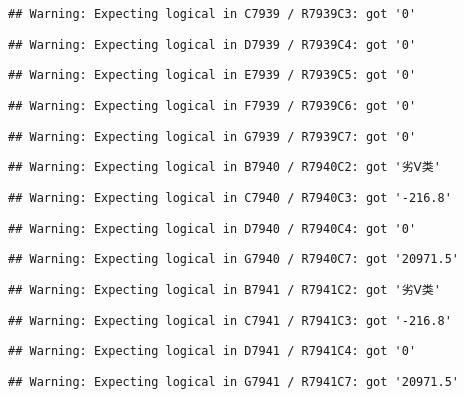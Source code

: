 \documentclass[
]{article}
\begin{document}
\begin{verbatim}
## Warning: Expecting logical in C7939 / R7939C3: got '0'
\end{verbatim}

\begin{verbatim}
## Warning: Expecting logical in D7939 / R7939C4: got '0'
\end{verbatim}

\begin{verbatim}
## Warning: Expecting logical in E7939 / R7939C5: got '0'
\end{verbatim}

\begin{verbatim}
## Warning: Expecting logical in F7939 / R7939C6: got '0'
\end{verbatim}

\begin{verbatim}
## Warning: Expecting logical in G7939 / R7939C7: got '0'
\end{verbatim}

\begin{verbatim}
## Warning: Expecting logical in B7940 / R7940C2: got '劣Ⅴ类'
\end{verbatim}

\begin{verbatim}
## Warning: Expecting logical in C7940 / R7940C3: got '-216.8'
\end{verbatim}

\begin{verbatim}
## Warning: Expecting logical in D7940 / R7940C4: got '0'
\end{verbatim}

\begin{verbatim}
## Warning: Expecting logical in G7940 / R7940C7: got '20971.5'
\end{verbatim}

\begin{verbatim}
## Warning: Expecting logical in B7941 / R7941C2: got '劣Ⅴ类'
\end{verbatim}

\begin{verbatim}
## Warning: Expecting logical in C7941 / R7941C3: got '-216.8'
\end{verbatim}

\begin{verbatim}
## Warning: Expecting logical in D7941 / R7941C4: got '0'
\end{verbatim}

\begin{verbatim}
## Warning: Expecting logical in G7941 / R7941C7: got '20971.5'
\end{verbatim}
\end{document}
